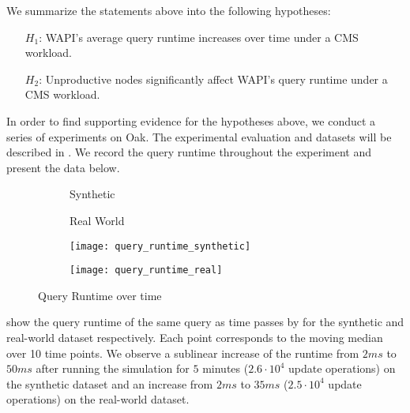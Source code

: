 \message{ !name(thesis.tex)}\documentclass[abstracton,12pt]{scrartcl}
\theoremstyle{definition}
\begin{document}
We summarize the statements above into the following hypotheses:

\begin{shaded}
  \begin{itemize}
  \item[$H_1$:] WAPI's average query runtime increases over time under a CMS workload.
  \item[$H_2$:] Unproductive nodes significantly affect WAPI's query runtime
    under a CMS workload. 
  \end{itemize}
\end{shaded}

In order to find supporting evidence for the hypotheses above, we conduct a series of
experiments on Oak. The experimental evaluation and
datasets will be described in . We
record the query runtime throughout the experiment and present the data below.

\begin{figure}
  \centering
  \begin{subfigure}{0.49\linewidth}
    \centering
    Synthetic
  \end{subfigure}
  \begin{subfigure}{0.49\linewidth}
    \centering
    Real World
  \end{subfigure}
  \begin{subfigure}{0.49\linewidth}
    \centering
    \texttt{[image: query\_runtime\_synthetic]}
    \caption{}
    \label{fig:query_runtime_synthetic}
  \end{subfigure}
  \begin{subfigure}{0.49\linewidth}
    \centering
    \texttt{[image: query\_runtime\_real]}
    \caption{}
    \label{fig:query_runtime_real}
  \end{subfigure}
  \caption{Query Runtime over time}
  \label{fig:query_runtime}
\end{figure}

 show the 
query runtime of the same query as time passes by for the synthetic and
real-world dataset respectively. 
Each point corresponds to the moving median over 10 time points.
We observe a sublinear increase of the runtime from $2 ms$ to $50 ms$
after running the simulation for $5$ minutes ($2.6 \cdot 10^4$ update operations)
on the synthetic dataset and an increase from $2 ms$ to $35 ms$ ($2.5 \cdot
10^4$ update operations) on the real-world dataset. 
\end{document}
